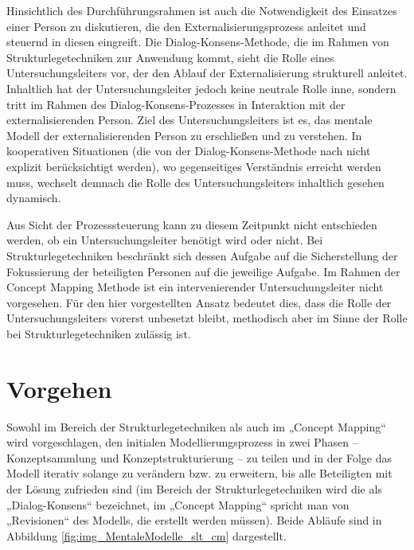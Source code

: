 Hinsichtlich des Durchführungsrahmen ist auch die Notwendigkeit des Einsatzes einer Person zu diskutieren, die den Externalisierungsprozess anleitet und steuernd in diesen eingreift. Die Dialog-Konsens-Methode, die im Rahmen von Strukturlegetechniken zur Anwendung kommt, sieht die Rolle eines Untersuchungsleiters vor, der den Ablauf der Externalisierung strukturell anleitet. Inhaltlich hat der Untersuchungsleiter jedoch keine neutrale Rolle inne, sondern tritt im Rahmen des Dialog-Konsens-Prozesses in Interaktion mit der externalisierenden Person. Ziel des Untersuchungsleiters ist es, das mentale Modell der externalisierenden Person zu erschließen und zu verstehen. In kooperativen Situationen (die von der Dialog-Konsens-Methode nach \citep{Scheele88} nicht explizit berücksichtigt werden), wo gegenseitiges Verständnis erreicht werden muss, wechselt demnach die Rolle des Untersuchungsleiters inhaltlich gesehen dynamisch. 

Aus Sicht der Prozesssteuerung kann zu diesem Zeitpunkt nicht entschieden werden, ob ein Untersuchungsleiter benötigt wird oder nicht. Bei Strukturlegetechniken beschränkt sich dessen Aufgabe auf die Sicherstellung der Fokussierung der beteiligten Personen auf die jeweilige Aufgabe. Im Rahmen der Concept Mapping Methode ist ein intervenierender Untersuchungsleiter nicht vorgesehen. Für den hier vorgestellten Ansatz bedeutet dies, dass die Rolle der Untersuchungsleiters vorerst unbesetzt bleibt, methodisch aber im Sinne der Rolle bei Strukturlegetechniken zulässig ist. 


\section{Vorgehen} %
\label{sub:vorgehen}

Sowohl im Bereich der Strukturlegetechniken als auch im „Concept Mapping“ wird vorgeschlagen, den initialen Modellierungsprozess in zwei Phasen -- Konzeptsammlung und Konzeptstrukturierung -- zu teilen und in der Folge das Modell iterativ solange zu verändern bzw. zu erweitern, bis alle Beteiligten mit der Lösung zufrieden sind (im Bereich der Strukturlegetechniken wird die als „Dialog-Konsens“ bezeichnet, im „Concept Mapping“ spricht man von „Revisionen“ des Modells, die erstellt werden müssen). Beide Abläufe sind in Abbildung \ref{fig:img_MentaleModelle_slt_cm} dargestellt.

